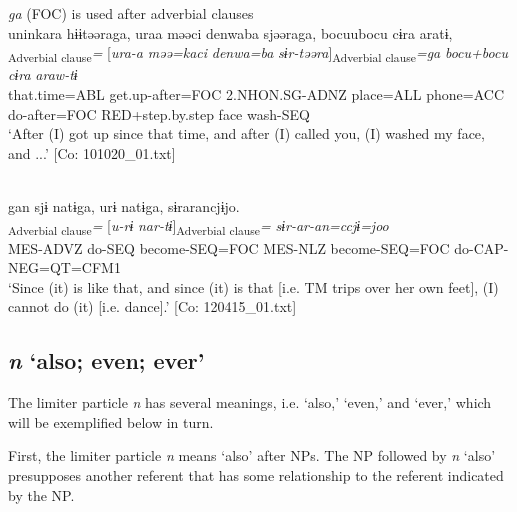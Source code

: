 \ea\label{ex:10.16}   \textit{ga} (FOC) is used after adverbial clauses\\
  \ea  %
      \glll    uninkara  hɨɨtəəraga,  uraa  məəci {\textbar}denwa{\textbar}ba  sjəəraga,  bocuubocu  cɨra  aratɨ,\\
      [\textit{unin=kara}  \textit{hɨɨr-təəra}]\textsubscript{Adverbial clause}\textit{=}  [\textit{ura-a}  \textit{məə=kaci}    \textit{denwa=ba}  \textit{sɨr-təəra}]\textsubscript{Adverbial clause}\textit{=ga}  \textit{bocu+bocu}  \textit{cɨra}  \textit{araw-tɨ}\\
      that.time=ABL  get.up-after=FOC  2.NHON.SG-ADNZ  place=ALL   phone=ACC  do-after=FOC  RED+step.by.step  face  wash-SEQ\\
      \glt       ‘After (I) got up since that time, and after (I) called you, (I) washed my face, and ...’ [Co: 101020\_01.txt]

  \ex{}\\
      \glll    gan  sjɨ  natɨga,  urɨ  natɨga,  sɨrarancjɨjo.\\
      [\textit{ga-n}  \textit{sɨr-tɨ}  \textit{nar-tɨ}]\textsubscript{Adverbial clause}\textit{=}  [\textit{u-rɨ}   \textit{nar-tɨ}]\textsubscript{Adverbial clause}\textit{=}  \textit{sɨr-ar-an=ccjɨ=joo}\\
      MES-ADVZ  do-SEQ  become-SEQ=FOC  MES-NLZ  become-SEQ=FOC  do-CAP-NEG=QT=CFM1\\
      \glt       ‘Since (it) is like that, and since (it) is that [i.e. TM trips over her own feet], (I) cannot do (it) [i.e. dance].’ [Co: 120415\_01.txt]
    \z
\z

\subsection{\textit{n} ‘also; even; ever’}\label{sec:10.1.3}

The limiter particle \textit{n} has several meanings, i.e. ‘also,’ ‘even,’ and ‘ever,’ which will be exemplified below in turn.

First, the limiter particle \textit{n} means ‘also’ after NPs. The NP followed by \textit{n} ‘also’ presupposes another referent that has some relationship to the referent indicated by the NP.

